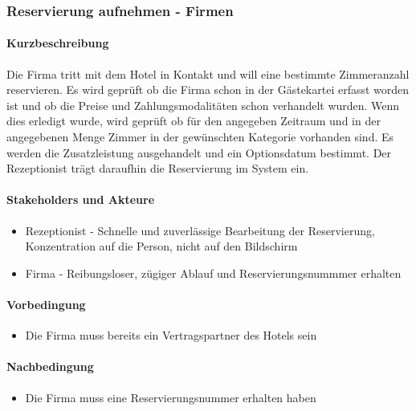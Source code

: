 \subsubsection{Reservierung aufnehmen - Firmen}

\paragraph{Kurzbeschreibung}  
Die Firma tritt mit dem Hotel in Kontakt und will eine bestimmte \Gls{Zimmer}anzahl reservieren. Es wird geprüft ob die Firma schon in der Gästekartei erfasst worden ist und ob die Preise und Zahlungsmodalitäten schon verhandelt wurden. Wenn dies erledigt wurde, wird geprüft ob für den angegeben Zeitraum und in der angegebenen Menge \Gls{Zimmer} in der gewünschten Kategorie vorhanden sind. Es werden die \Gls{Zusatzleistung} ausgehandelt und ein \Gls{Optionsdatum} bestimmt. Der \Gls{Rezeptionist} trägt daraufhin die \Gls{Reservierung} im System ein.

\paragraph{Stakeholders und Akteure}
\begin{itemize}
	\item \Gls{Rezeptionist} - Schnelle und zuverlässige Bearbeitung der \Gls{Reservierung}, Konzentration auf die Person, nicht auf den Bildschirm
	\item Firma - Reibungsloser, zügiger Ablauf und Reservierungsnummmer erhalten
\end{itemize}

\paragraph{Vorbedingung}
\begin{itemize}
	\item Die Firma muss bereits ein Vertragspartner des Hotels sein
\end{itemize}

\paragraph{Nachbedingung}
\begin{itemize}
	\item Die Firma muss eine \Gls{Reservierungsnummer} erhalten haben
\end{itemize}

